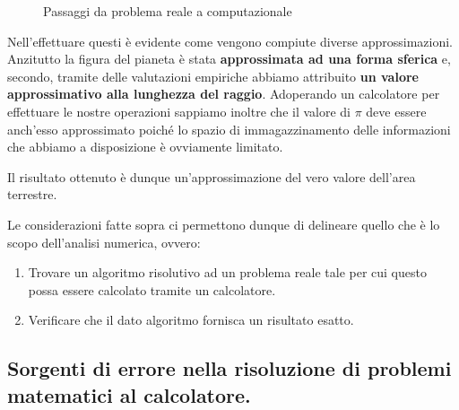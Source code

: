 \documentclass[12pt, a4paper]{book}
\theoremstyle{definition}
\begin{document}
\begin{flushleft}
\begin{figure}[h]
	\caption{Passaggi da problema reale a computazionale}
	\label{schema passaggi}
\end{figure}

Nell'effettuare questi è evidente come vengono compiute diverse approssimazioni.  Anzitutto la figura del pianeta è stata \textbf{approssimata ad una forma sferica} e, secondo,  tramite delle valutazioni empiriche abbiamo attribuito \textbf{un valore approssimativo alla lunghezza del raggio}.  Adoperando un calcolatore per effettuare le nostre operazioni sappiamo inoltre che il valore di $\pi$ deve essere anch'esso approssimato poiché lo spazio di immagazzinamento delle informazioni che abbiamo a disposizione è ovviamente limitato. 

\vfill
Il risultato ottenuto è dunque un'approssimazione del vero valore dell'area terrestre. 

Le considerazioni fatte sopra ci permettono dunque di delineare quello che è lo scopo dell'analisi numerica, ovvero:
\begin{enumerate}
  \item Trovare un algoritmo risolutivo ad un problema reale tale per cui questo possa essere calcolato tramite un calcolatore.
  \item Verificare che il dato algoritmo fornisca un risultato esatto. 
\end{enumerate}
\end{flushleft}

\subsection{Sorgenti di errore nella risoluzione di problemi matematici al calcolatore.}
\end{document}
